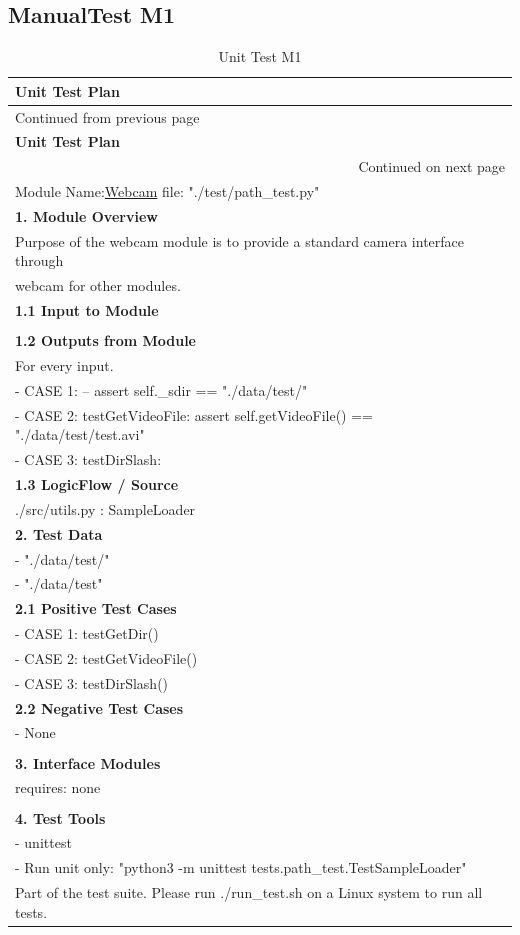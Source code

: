 \documentclass[12pt,a4paper,man]{report}
\begin{document}
\subsection{ManualTest M1}
\label{sec:org2417709}
\begin{longtable}{|p{7in}|}
\caption{\label{table:utest_m1}
Unit Test M1}
\\
\hline
\textbf{Unit Test Plan} \cellcolor{blue!25}\\
\hline
\endfirsthead
\multicolumn{1}{l}{Continued from previous page} \\
\hline

\textbf{Unit Test Plan} \cellcolor{blue!25} \\

\hline
\endhead
\hline\multicolumn{1}{r}{Continued on next page} \\
\endfoot
\endlastfoot
\hline
\hline
Module Name:\underline{Webcam} \hspace{2in}  file:  "./test/path\_test.py"\\
\hline
\textbf{1. Module Overview}\\
\hline
Purpose of the webcam module is to provide a standard camera interface through\\
webcam for other modules.\\
\hline
\textbf{1.1 Input to Module}\\
\hline
\\
\hline
\textbf{1.2 Outputs from Module}\\
\hline
For every input.\\
- CASE 1:  -- assert self.\_sdir == "./data/test/"\\
- CASE 2: testGetVideoFile: assert self.getVideoFile() == "./data/test/test.avi"\\
- CASE 3: testDirSlash:\\
\hline
\textbf{1.3 LogicFlow / Source}\\
\hline
./src/utils.py : SampleLoader\\
\hline
\textbf{2. Test Data}\\
\hline
- "./data/test/"\\
- "./data/test"\\
\hline
\textbf{2.1 Positive Test Cases}\\
\hline
- CASE 1: testGetDir()\\
- CASE 2: testGetVideoFile()\\
- CASE 3: testDirSlash()\\
\hline
\textbf{2.2 Negative Test Cases}\\
\hline
- None\\
\\
\hline
\textbf{3. Interface Modules}\\
\hline
requires: none\\
\\
\hline
\textbf{4. Test Tools}\\
\hline
- unittest\\
- Run unit only: "python3 -m unittest tests.path\_test.TestSampleLoader"\\
Part of the test suite. Please run ./run\_test.sh on a Linux system to run all tests.\\
\hline
\end{longtable}
\end{document}
